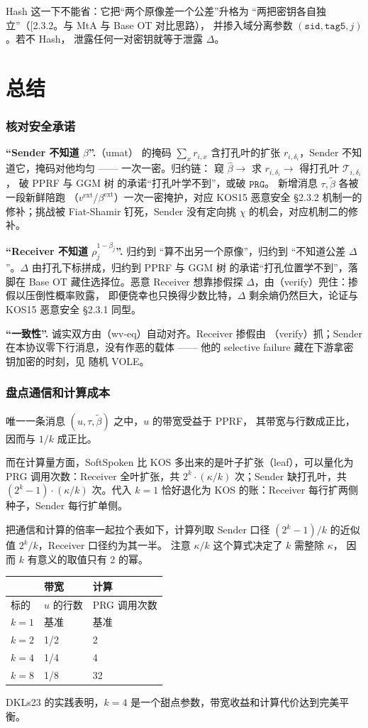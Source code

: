 Hash 这一下不能省：它把“两个原像差一个公差”升格为
“两把密钥各自独立”（{[}2.3.2。与 MtA 与 Base OT 对比思路），
并掺入域分离参数 $(\mathtt{sid}, \mathtt{tag5}, j)$。若不 Hash，
泄露任何一对密钥就等于泄露 $\Delta$。

\section{总结}
\subsubsection{核对安全承诺}

\textbf{“Sender 不知道 $\beta$”.}（umat）
的掩码 $\sum_x r_{i,x}$ 含打孔叶的扩张 $r_{i,\delta_i}$，Sender
不知道它，掩码对他均匀 ------ 一次一密。归约链：
窥 $\hat\beta$$\to$ 求 $r_{i,\delta_i}$$\to$ 得打孔叶 $\mathcal{T}_{i,\delta_i}$，
破 PPRF 与 GGM 树 的承诺“打孔叶学不到”，或破 $\mathtt{PRG}$。
新增消息 $\tau, \tilde\beta$ 各被一段新鲜陪跑
（$v^\mathrm{ext}$/$\beta^\mathrm{ext}$）一次一密掩护，对应 KOS15
恶意安全 §2.3.2 机制一的修补；挑战被 Fiat-Shamir 钉死，Sender
没有定向挑 $\chi$ 的机会，对应机制二的修补。

\textbf{“Receiver 不知道 $\rho^{1-\beta_j}_j$”.} 归约到
“算不出另一个原像”，归约到
“不知道公差 $\Delta$”。$\Delta$ 由打孔下标拼成，归约到 PPRF 与 GGM 树
的承诺“打孔位置学不到”，落脚在 Base OT 藏住选择位。恶意 Receiver
想靠掺假探 $\Delta$，由（verify）兜住：掺假以压倒性概率败露，
即便侥幸也只换得少数比特，$\Delta$ 剩余熵仍然巨大，论证与 KOS15 恶意安全
§2.3.1 同型。

\textbf{“一致性”.} 诚实双方由（wv-eq）自动对齐。Receiver 掺假由
（verify）抓；Sender 在本协议零下行消息，没有作恶的载体 ------ 他的
selective failure 藏在下游拿密钥加密的时刻，见 随机 VOLE。

\subsubsection{盘点通信和计算成本}

唯一一条消息 $(u, \tau, \tilde\beta)$ 之中，$u$ 的带宽受益于 PPRF，
其带宽与行数成正比，因而与 $1/k$ 成正比。

而在计算量方面，SoftSpoken 比 KOS 多出来的是叶子扩张（leaf），可以量化为
PRG 调用次数：Receiver 全叶扩张，共 $2^k \cdot (\kappa/k)$ 次；Sender
缺打孔叶，共 $(2^k - 1) \cdot (\kappa/k)$ 次。代入 $k=1$ 恰好退化为 KOS
的账：Receiver 每行扩两侧种子，Sender 每行扩单侧。

把通信和计算的倍率一起拉个表如下，计算列取 Sender
口径 $(2^k-1)/k$ 的近似值 $2^k/k$，Receiver 口径约为其一半。
注意 $\kappa/k$ 这个算式决定了 $k$ 需整除 $\kappa$，
因而 $k$ 有意义的取值只有 2 的幂。

\begin{longtable}[]{@{}lll@{}}
\toprule\noalign{}
& 带宽 & 计算 \\
\midrule\noalign{}
\endhead
\bottomrule\noalign{}
\endlastfoot
标的 & $u$ 的行数 & PRG 调用次数 \\
$k=1$ & 基准 & 基准 \\
$k=2$ & 1/2 & 2 \\
$k=4$ & 1/4 & 4 \\
$k=8$ & 1/8 & 32 \\
\end{longtable}

DKLs23 的实践表明，$k=4$ 是一个甜点参数，带宽收益和计算代价达到完美平衡。
